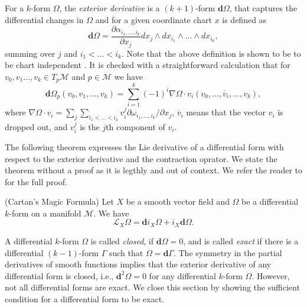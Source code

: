For a $k$-form $\Omega$, the \emph{exterior derivative} is a $(k+1)$-form $\mathbf d \Omega$, that captures the differential changes in $\Omega$ and for a given coordinate chart $x$ is defined as
\begin{equation} \label{eq:2.13}
	\mathbf d \Omega = \frac{\partial \alpha_{i_1,\dots,i_k}}{\partial x_j} dx_j\wedge dx_{i_1}\wedge\dots\wedge dx_{i_k},
\end{equation}
summing over $j$ and $i_1<\dots<i_k$. Note that the above definition is shown to be to be chart independent \cite{rudin1964principles}. It is checked with a straightforward calculation that for $v_0,v_1\dots,v_k \in T_p\mathcal M$ and $p\in \mathcal M$ we have
\begin{equation} \label{eq:2.14}
	\mathbf d \Omega_p(v_0,v_1,\dots,v_k) = \sum_{i=1}^k (-1)^i \nabla \Omega \cdot v_i (v_0,\dots,\mathring{v_i},\dots,v_k), 
\end{equation}
where $\nabla \Omega \cdot v_i = \sum_j \sum_{i_1<\dots<i_k} v_i^j \partial \omega_{i_1,\dots,i_k}/\partial x_j$, $\mathring{v_i}$ means that the vector $v_i$ is dropped out, and $v_i^j$ is the $j$th component of $v_i$. 

The following theorem expresses the Lie derivative of a differential form with respect to the exterior derivative and the contraction oprator. We state the theorem without a proof as it is legthly and out of context. We refer the reader to \cite{abraham1978foundations} for the full proof.

\begin{theorem} \cite{abraham1978foundations}
(Cartan's Magic Formula) Let $X$ be a smooth vector field and $\Omega$ be a differential $k$-form on a manifold $\mathcal M$. We have
\begin{equation}
	\mathcal L_X \Omega = \mathbf d i_X \Omega + i_X \mathbf d \Omega.
\end{equation}
\end{theorem}

A differential $k$-form $\Omega$ is called \emph{closed}, if $\mathbf d \Omega = 0$, and is called \emph{exact} if there is a differential $(k-1)$-form $\Gamma$ such that $\Omega = \mathbf d \Gamma$. The symmetry in the partial derivatives of smooth functions implies that the exterior derivative of any differential form is closed, i.e., $\mathbf d^2 \Omega = 0$ for any differential $k$-form $\Omega$. However, not all differential forms are exact. We close this section by showing the sufficient condition for a differential form to be exact.

